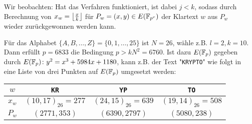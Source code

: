 \begin{bem}
	Wir beobachten: Hat das Verfahren funktioniert, ist dabei $j < k$, sodass durch Berechnung von $x_w = \floor*{\frac{x}{k}}$ für $P_w=(x,y) \in E(\FF_{p^r})$ der Klartext $w$ aus $P_w$ wieder zurückgewonnen werden kann.
\end{bem}

\begin{bsp}
	Für das Alphabet $\{A,B,\dots,Z\} = \{0,1,\dots,25\}$ ist $N = 26$, wähle z.B. $l = 2, k=10$.
	Dann erfüllt $p=6833$ die Bedingung $p > kN^2 = 6760$.
	Ist dazu $E(\FF_p)$ gegeben durch $E(\FF_p)\colon y^2 = x^3 + 5984x + 1180$, kann z.B. der Text "\texttt{KRYPTO}" wie folgt in eine Liste von drei Punkten auf $E(\FF_p)$ umgesetzt werden:
	\begin{center}
		\begin{tabular}{c||c|c|c}
		$w$ & \texttt{KR} & \texttt{YP} & \texttt{TO} \\ 
		\hline $x_w$ & $(10,17)_{26} = 277$ & $(24,15)_{26} = 639$ & $(19,14)_{26} = 508$ \\ 
		\hline $P_w$ & $(2771,353)$ & $(6390,2797)$ & $(5080,238)$
		\end{tabular} 
	\end{center}
\end{bsp}